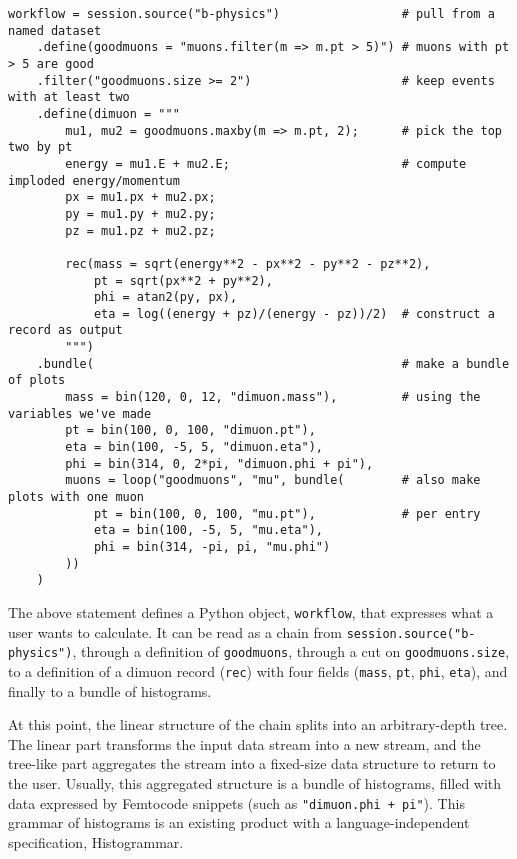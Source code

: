 \documentclass{article}
\begin{document}
\begin{verbatim}
workflow = session.source("b-physics")                 # pull from a named dataset
    .define(goodmuons = "muons.filter(m => m.pt > 5)") # muons with pt > 5 are good
    .filter("goodmuons.size >= 2")                     # keep events with at least two
    .define(dimuon = """
        mu1, mu2 = goodmuons.maxby(m => m.pt, 2);      # pick the top two by pt
        energy = mu1.E + mu2.E;                        # compute imploded energy/momentum
        px = mu1.px + mu2.px;
        py = mu1.py + mu2.py;
        pz = mu1.pz + mu2.pz;

        rec(mass = sqrt(energy**2 - px**2 - py**2 - pz**2),
            pt = sqrt(px**2 + py**2),
            phi = atan2(py, px),
            eta = log((energy + pz)/(energy - pz))/2)  # construct a record as output
        """)
    .bundle(                                           # make a bundle of plots
        mass = bin(120, 0, 12, "dimuon.mass"),         # using the variables we've made
        pt = bin(100, 0, 100, "dimuon.pt"),
        eta = bin(100, -5, 5, "dimuon.eta"),
        phi = bin(314, 0, 2*pi, "dimuon.phi + pi"),
        muons = loop("goodmuons", "mu", bundle(        # also make plots with one muon
            pt = bin(100, 0, 100, "mu.pt"),            # per entry
            eta = bin(100, -5, 5, "mu.eta"),
            phi = bin(314, -pi, pi, "mu.phi")
        ))
    )
\end{verbatim}

The above statement defines a Python object, {\tt workflow}, that expresses what a user wants to calculate. It can be read as a chain from {\tt session.source("b-physics")}, through a definition of {\tt goodmuons}, through a cut on {\tt goodmuons.size}, to a definition of a dimuon record ({\tt rec}) with four fields ({\tt mass}, {\tt pt}, {\tt phi}, {\tt eta}), and finally to a bundle of histograms.

At this point, the linear structure of the chain splits into an arbitrary-depth tree. The linear part transforms the input data stream into a new stream, and the tree-like part aggregates the stream into a fixed-size data structure to return to the user. Usually, this aggregated structure is a bundle of histograms, filled with data expressed by Femtocode snippets (such as {\tt "dimuon.phi + pi"}). This grammar of histograms is an existing product with a language-independent specification, Histogrammar\footnotemark.

\end{document}
